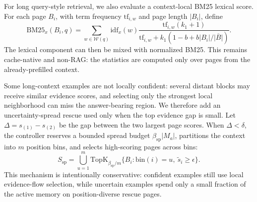 \documentclass{article}
\newcommand{\TopK}{\mathrm{TopK}}
\begin{document}
For long query-style retrieval, we also evaluate a context-local BM25 lexical score.
For each page $B_i$, with term frequency $\mathrm{tf}_{i,w}$ and page length $|B_i|$, define
\begin{equation}
    \mathrm{BM25}_x(B_i,q)
    =
    \sum_{w\in\mathcal{W}(q)}
    \mathrm{idf}_x(w)
    \frac{\mathrm{tf}_{i,w}(k_1+1)}
    {\mathrm{tf}_{i,w}+k_1(1-b+b|B_i|/\overline{|B|})}.
    \label{eq:context-bm25}
\end{equation}
The lexical component can then be mixed with normalized BM25.
This remains cache-native and non-RAG: the statistics are computed only over pages from the already-prefilled context.

Some long-context examples are not locally confident: several distant blocks may receive similar evidence scores, and selecting only the strongest local neighborhood can miss the answer-bearing region.
We therefore add an uncertainty-spread rescue used only when the top evidence gap is small.
Let $\Delta=s_{(1)}-s_{(2)}$ be the gap between the two largest page scores.
When $\Delta < \delta$, the controller reserves a bounded spread budget $\beta_{\mathrm{sp}}|M_a|$, partitions the context into $m$ position bins, and selects high-scoring pages across bins:
\begin{equation}
    S_{\mathrm{sp}}
    =
    \bigcup_{u=1}^{m}
    \TopK_{\beta_{\mathrm{sp}}/m}
    \{B_i : \mathrm{bin}(i)=u,\ \tilde{s}_i \geq \epsilon \}.
    \label{eq:uncertainty-spread}
\end{equation}
This mechanism is intentionally conservative: confident examples still use local evidence-flow selection, while uncertain examples spend only a small fraction of the active memory on position-diverse rescue pages.
\end{document}
